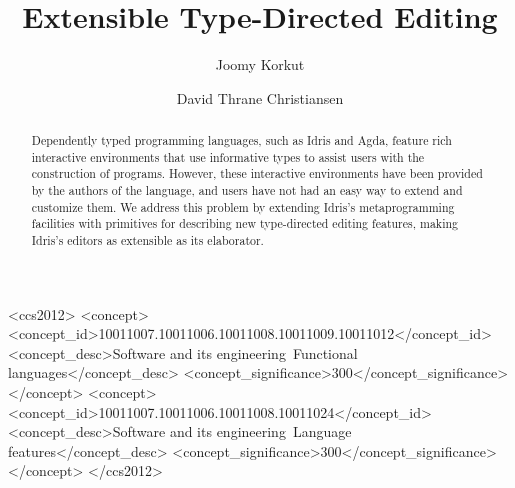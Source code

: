 \documentclass[sigplan, review, timestamp]{acmart}
\begin{document}
\title[Extensible Type-Directed Editing]{Extensible Type-Directed Editing}


\author{Joomy Korkut}

\author{David Thrane Christiansen}


\renewcommand{\shortauthors}{Joomy Korkut and David Christiansen}

\begin{abstract}
  Dependently typed programming languages, such as Idris and Agda, feature rich interactive environments that use informative types to assist users with the construction of programs. However, these interactive environments have been provided by the authors of the language, and users have not had an easy way to extend and customize them. We address this problem by extending Idris's metaprogramming facilities with primitives for describing new type-directed editing features, making Idris's editors as extensible as its elaborator.
\end{abstract}

%
%
 \begin{CCSXML}
<ccs2012>
<concept>
<concept_id>10011007.10011006.10011008.10011009.10011012</concept_id>
<concept_desc>Software and its engineering~Functional languages</concept_desc>
<concept_significance>300</concept_significance>
</concept>
<concept>
<concept_id>10011007.10011006.10011008.10011024</concept_id>
<concept_desc>Software and its engineering~Language features</concept_desc>
<concept_significance>300</concept_significance>
</concept>
</ccs2012>
\end{CCSXML}


\maketitle
\end{document}
